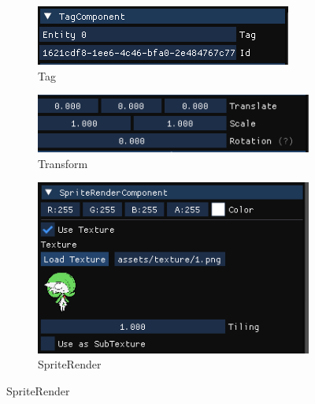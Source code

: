 \begin{figure}[h]
    \begin{subfigure}[b]{0.24\linewidth}
        \begin{center}
        \includegraphics[width=\linewidth]{./resources/editor/ins_tag.png}
        \caption{Tag}
        \end{center}
    \end{subfigure}
    \begin{subfigure}[b]{0.24\linewidth}
        \begin{center}
        \includegraphics[width=\linewidth]{./resources/editor/ins_transform.png}
        \caption{Transform}
        \end{center}
    \end{subfigure}
    \begin{subfigure}[b]{0.24\linewidth}
        \begin{center}
        \includegraphics[width=\linewidth]{./resources/editor/ins_render.png}
        \caption{SpriteRender}
        \end{center}
    \end{subfigure}

\end{figure}
